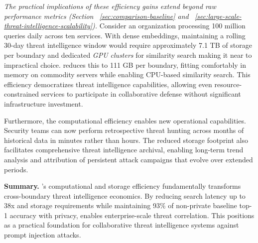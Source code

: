 \emph{The practical implications of these efficiency gains extend beyond raw performance metrics (Section ~\ref{sec:comparison-baseline} and ~\ref{sec:large-scale-threat-intelligence-scalability}).}
Consider an organization processing 100 million queries daily across ten services. With dense embeddings, maintaining a rolling 30-day threat intelligence window would require approximately 7.1 TB of storage per boundary and dedicated \emph{GPU clusters} for similarity search making it near to impractical choice. \tool reduces this to 111 GB per boundary, fitting comfortably in memory on commodity servers while enabling CPU-based similarity search. This efficiency democratizes threat intelligence capabilities, allowing even resource-constrained services to participate in collaborative defense without significant infrastructure investment.

Furthermore, the computational efficiency enables new operational capabilities. 
Security teams can now perform retrospective threat hunting across months of historical data in minutes rather than hours.
The reduced storage footprint also facilitates comprehensive threat intelligence archival, enabling long-term trend analysis and attribution of persistent attack campaigns that evolve over extended periods.

\begin{tcolorbox}[colback=white, colframe=black,  left=0pt, right=0pt, top=0pt, bottom=0pt]
    \textbf{Summary.} \tool's computational and storage efficiency fundamentally transforms cross-boundary threat intelligence economics. 
    By reducing search latency up to 38x and storage requirements while maintaining 93\% of non-private baseline top-1 accuracy with privacy, \tool enables enterprise-scale threat correlation. 
    This positions \tool as a practical foundation for collaborative threat intelligence systems against prompt injection attacks. 
\end{tcolorbox}
